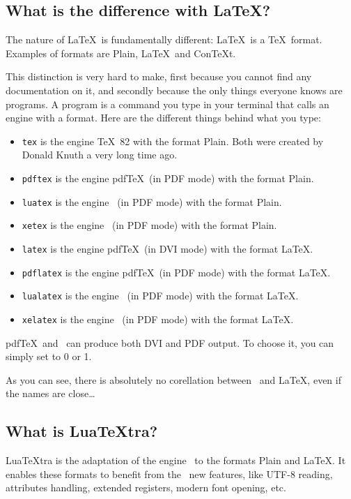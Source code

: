\documentclass{article}
\makeatletter
\newlength\xxt@kern@Te
\newlength\xxt@kern@eX
\newlength\xxt@lower@e
\DeclareRobustCommand\XeTeX{%
  \leavevmode
  \smash{%
   X\lower\xxt@lower@e
   \hbox{\kern\xxt@kern@eX
   \setbox0=\hbox{E}\dimen0=\ht0\advance\dimen0by\dp0%
   \raise\dimen0\hbox{\rotatebox{180}{\box0}}%
   }\kern\xxt@kern@Te\TeX}}%
\makeatother
\begin{document}
\subsection{What is the difference with \LaTeX ?}

The nature of \LaTeX\ is fundamentally different: \LaTeX\ is a \TeX\ format.
Examples of formats are Plain, \LaTeX\ and Con\TeX t.

This distinction is very hard to make, first because you cannot find any
documentation on it, and secondly because the only things everyone knows are
programs. A program is a command you type in your terminal that calls an
engine with a format. Here are the different things behind what you type:

\begin{itemize}
  \item \texttt{tex} is the engine \TeX\ 82 with the format Plain. Both were
    created by Donald Knuth a very long time ago.
  \item \texttt{pdftex} is the engine pdf\TeX\ (in PDF mode) with the format
    Plain.
  \item \texttt{luatex} is the engine \LuaTeX\ (in PDF mode) with the format
    Plain.
  \item \texttt{xetex} is the engine \XeTeX\ (in PDF mode) with the format
    Plain.
  \item \texttt{latex} is the engine pdf\TeX\ (in DVI mode) with the format
    \LaTeX .
  \item \texttt{pdflatex} is the engine pdf\TeX\ (in PDF mode) with the format
    \LaTeX .
  \item \texttt{lualatex} is the engine \LuaTeX\ (in PDF mode) with the format
    \LaTeX .
  \item \texttt{xelatex} is the engine \XeTeX\ (in PDF mode) with the format
    \LaTeX .
\end{itemize}

pdf\TeX\ and \LuaTeX\ can produce both DVI and PDF output. To choose it, you
can simply set \texttt{\string\pdfoutput} to 0 or 1.

As you can see, there is absolutely no corellation between \LuaTeX\ and
\LaTeX, even if the names are close\dots

\subsection{What is Lua\TeX tra?\label{sub:luatextra}}

Lua\TeX tra is the adaptation of the engine \LuaTeX\ to the formats Plain and
\LaTeX . It enables these formats to benefit from the \LuaTeX\ new features,
like UTF-8 reading, attributes handling, extended registers, modern font
opening, etc.
\end{document}
